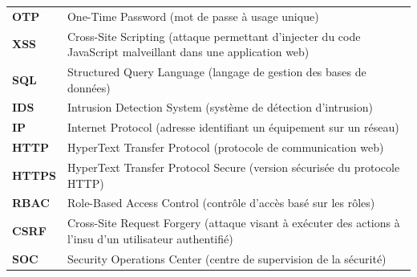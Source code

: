 \documentclass[a4paper,12pt]{report}
\begin{document}
    \begin{table}[H]
        \centering
        \begin{tabular}{p{4cm} p{10cm}}
            
            \textbf{OTP} & One-Time Password (mot de passe à usage unique) \\
            
            \textbf{XSS} & Cross-Site Scripting (attaque permettant d’injecter du code JavaScript malveillant dans une application web) \\
            
            \textbf{SQL} & Structured Query Language (langage de gestion des bases de données) \\
            
            \textbf{IDS} & Intrusion Detection System (système de détection d’intrusion) \\
            
            \textbf{IP} & Internet Protocol (adresse identifiant un équipement sur un réseau) \\
            
            \textbf{HTTP} & HyperText Transfer Protocol (protocole de communication web) \\
            
            \textbf{HTTPS} & HyperText Transfer Protocol Secure (version sécurisée du protocole HTTP) \\
            
            \textbf{RBAC} & Role-Based Access Control (contrôle d’accès basé sur les rôles) \\
            
            \textbf{CSRF} & Cross-Site Request Forgery (attaque visant à exécuter des actions à l’insu d’un utilisateur authentifié) \\
            
            \textbf{SOC} & Security Operations Center (centre de supervision de la sécurité) \\
            
        \end{tabular}
    \end{table}
    
    \newpage
    \listoftables
    
    \newpage
    \listoffigures
    
\end{document}

